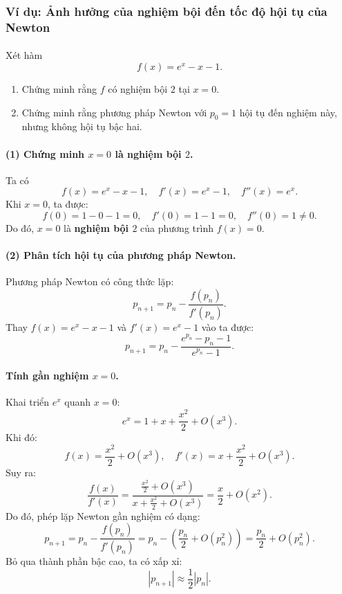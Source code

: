 \subsubsection*{Ví dụ: Ảnh hưởng của nghiệm bội đến tốc độ hội tụ của Newton}

\paragraph*{}
Xét hàm
\[
    f(x) = e^x - x - 1.
\]
\begin{enumerate}
    \item Chứng minh rằng $f$ có nghiệm bội $2$ tại $x = 0$.
    \item Chứng minh rằng phương pháp Newton với $p_0 = 1$ hội tụ đến nghiệm này, 
    nhưng không hội tụ bậc hai.
\end{enumerate}

\paragraph*{(1) Chứng minh $x = 0$ là nghiệm bội $2$.}
Ta có
\[
    f(x) = e^x - x - 1, \quad f'(x) = e^x - 1, \quad f''(x) = e^x.
\]
Khi $x = 0$, ta được:
\[
    f(0) = 1 - 0 - 1 = 0, \quad f'(0) = 1 - 1 = 0, \quad f''(0) = 1 \ne 0.
\]
Do đó, $x = 0$ là \textbf{nghiệm bội $2$} của phương trình $f(x) = 0$.

\paragraph*{(2) Phân tích hội tụ của phương pháp Newton.}
Phương pháp Newton có công thức lặp:
\[
    p_{n+1} = p_n - \frac{f(p_n)}{f'(p_n)}.
\]
Thay $f(x) = e^x - x - 1$ và $f'(x) = e^x - 1$ vào ta được:
\[
    p_{n+1} = p_n - \frac{e^{p_n} - p_n - 1}{e^{p_n} - 1}.
\]

\paragraph*{Tính gần nghiệm $x = 0$.}
Khai triển $e^x$ quanh $x=0$:
\[
    e^x = 1 + x + \frac{x^2}{2} + O(x^3).
\]
Khi đó:
\[
    f(x) = \frac{x^2}{2} + O(x^3), \quad f'(x) = x + \frac{x^2}{2} + O(x^3).
\]
Suy ra:
\[
    \frac{f(x)}{f'(x)} 
    = \frac{\tfrac{x^2}{2} + O(x^3)}{x + \tfrac{x^2}{2} + O(x^3)} 
    = \frac{x}{2} + O(x^2).
\]
Do đó, phép lặp Newton gần nghiệm có dạng:
\[
    p_{n+1} = p_n - \frac{f(p_n)}{f'(p_n)} = p_n - \left( \frac{p_n}{2} + O(p_n^2) \right)
    = \frac{p_n}{2} + O(p_n^2).
\]
Bỏ qua thành phần bậc cao, ta có xấp xỉ:
\[
    |p_{n+1}| \approx \frac{1}{2} |p_n|.
\]

